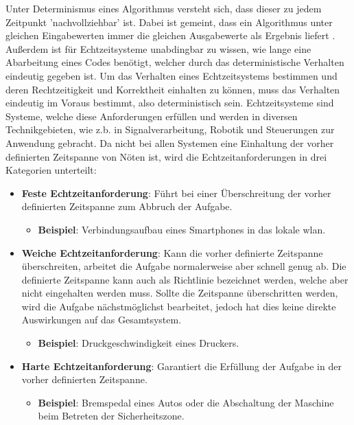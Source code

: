 \documentclass[../EDF Master Thesis.tex]{subfiles}
\begin{document}
Unter Determinismus eines Algorithmus versteht sich, dass dieser zu jedem Zeitpunkt 'nachvollziehbar' ist.
Dabei ist gemeint, dass ein Algorithmus unter gleichen Eingabewerten immer die gleichen Ausgabewerte als Ergebnis liefert \autocite{determinismus}.
Außerdem ist für Echtzeitsysteme unabdingbar zu wissen, wie lange eine Abarbeitung eines Codes benötigt, welcher durch das deterministische Verhalten eindeutig gegeben ist. 
Um das Verhalten eines Echtzeitsystems bestimmen und deren Rechtzeitigkeit und Korrektheit einhalten zu können, muss das Verhalten eindeutig im Voraus bestimmt, also deterministisch sein.
    Echtzeitsysteme sind Systeme, welche diese Anforderungen erfüllen und werden in diversen Technikgebieten, wie z.b. in Signalverarbeitung, Robotik und Steuerungen zur Anwendung gebracht.
    Da nicht bei allen Systemen eine Einhaltung der vorher definierten Zeitspanne von Nöten ist, wird die Echtzeitanforderungen in drei Kategorien unterteilt:
    \begin{itemize}
        \item \textbf{Feste Echtzeitanforderung}: Führt bei einer Überschreitung der vorher definierten Zeitspanne zum Abbruch der Aufgabe.
            \begin{itemize}
                \item \textbf{Beispiel}: Verbindungsaufbau eines Smartphones in das lokale \ac{wlan}.
            \end{itemize}
        \item \textbf{Weiche Echtzeitanforderung}: Kann die vorher definierte Zeitspanne überschreiten, arbeitet die Aufgabe normalerweise aber schnell genug ab.
            Die definierte Zeitspanne kann auch als Richtlinie bezeichnet werden, welche aber nicht eingehalten werden muss. 
            Sollte die Zeitspanne überschritten werden, wird die Aufgabe nächstmöglichst bearbeitet, jedoch hat dies keine direkte Auswirkungen auf das Gesamtsystem.
            \begin{itemize}
                \item \textbf{Beispiel}: Druckgeschwindigkeit eines Druckers.
            \end{itemize}
        \item \textbf{Harte Echtzeitanforderung}: Garantiert die Erfüllung der Aufgabe in der vorher definierten Zeitspanne.
        \begin{itemize}
            \item \textbf{Beispiel}: Bremspedal eines Autos oder die Abschaltung der Maschine beim Betreten der Sicherheitszone.
        \end{itemize}
    \end{itemize}
\end{document}
